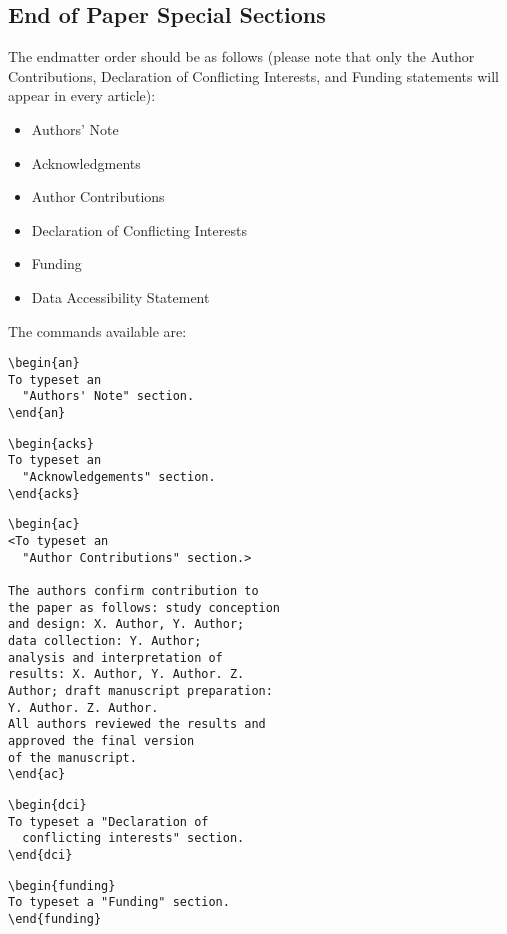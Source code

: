 \documentclass[times]{TRR}
\begin{document}
\subsection{End of Paper Special Sections}
The endmatter order should be as follows (please note that only the Author Contributions, Declaration of Conflicting Interests, and Funding statements will appear in every article):
\begin{itemize}
\item	Authors’ Note
\item	Acknowledgments
\item	Author Contributions
\item	Declaration of Conflicting Interests
\item	Funding
\item	Data Accessibility Statement
\end{itemize}

The commands available are:
\begin{verbatim}
\begin{an}
To typeset an
  "Authors' Note" section.
\end{an}
\end{verbatim}

\begin{verbatim}
\begin{acks}
To typeset an
  "Acknowledgements" section.
\end{acks}
\end{verbatim}

\begin{verbatim}
\begin{ac}
<To typeset an
  "Author Contributions" section.>
  
The authors confirm contribution to
the paper as follows: study conception
and design: X. Author, Y. Author; 
data collection: Y. Author; 
analysis and interpretation of 
results: X. Author, Y. Author. Z. 
Author; draft manuscript preparation:
Y. Author. Z. Author. 
All authors reviewed the results and
approved the final version 
of the manuscript.
\end{ac}
\end{verbatim}

\begin{verbatim}
\begin{dci}
To typeset a "Declaration of
  conflicting interests" section.
\end{dci}
\end{verbatim}

\begin{verbatim}
\begin{funding}
To typeset a "Funding" section.
\end{funding}
\end{verbatim}
\end{document}
